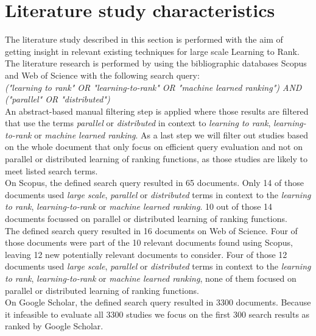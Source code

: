 \section{Literature study characteristics}
The literature study described in this section is performed with the aim of getting insight in relevant existing techniques for large scale Learning to Rank. The literature research is performed by using the bibliographic databases Scopus and Web of Science with the following search query:\\

\emph{("learning to rank" \emph{OR} "learning-to-rank" \emph{OR} "machine learned ranking") \emph{AND} ("parallel" \emph{OR} "distributed")}\\
 
An abstract-based manual filtering step is applied where those results are filtered that use the terms \emph{parallel} or \emph{distributed} in context to \emph{learning to rank}, \emph{learning-to-rank} or \emph{machine learned ranking}. As a last step we will filter out studies based on the whole document that only focus on efficient query evaluation and not on parallel or distributed learning of ranking functions, as those studies are likely to meet listed search terms.\\

On Scopus, the defined search query resulted in 65 documents. Only 14 of those documents used \emph{large scale}, \emph{parallel} or \emph{distributed} terms in context to the \emph{learning to rank}, \emph{learning-to-rank} or \emph{machine learned ranking}. 10 out of those 14 documents focussed on parallel or distributed learning of ranking functions.\\

The defined search query resulted in 16 documents on Web of Science. Four of those documents were part of the 10 relevant documents found using Scopus, leaving 12 new potentially relevant documents to consider. Four of those 12 documents used \emph{large scale}, \emph{parallel} or \emph{distributed} terms in context to the \emph{learning to rank}, \emph{learning-to-rank} or \emph{machine learned ranking}, none of them focused on parallel or distributed learning of ranking functions.\\

On Google Scholar, the defined search query resulted in 3300 documents. Because it infeasible to evaluate all 3300 studies we focus on the first 300 search results as ranked by Google Scholar.\\

